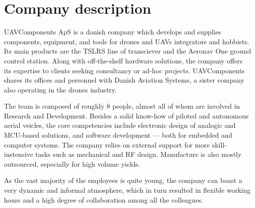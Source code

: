 \section{Company description}
UAVComponents ApS is a danish company which develops and supplies components, equipment, and tools for drones and UAVs integrators and hobbists.
Its main products are the TSLRS line of transciever and the Aeronav One ground control station.
Along with off-the-shelf hardware solutions, the company offers its expertise to clients seeking consultancy or ad-hoc projects.
UAVComponents shares its offices and personnel with Danish Aviation Systems, a sister company also operating in the drones industry. 

The team is composed of roughly 8 people, almost all of whom are involved in Research and Development. 
Besides a solid know-how of piloted and autonomous aerial veicles, the core competencies include electronic design of analogic and MCU-based solutions, and software development --- both for embedded and computer systems. 
The company relies on external support for more skill-instensive tasks such as mechanical and RF design. 
Manufacture is also mostly outsourced, especially for high volume yields.

As the vast majority of the employees is quite young, the company can boast a very dynamic and informal atmosphere, which in turn resulted in flexible working hours and a high degree of collaboration among all the colleagues.

